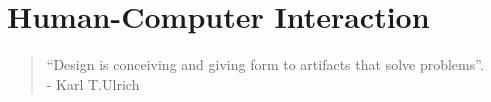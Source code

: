 \section{Human-Computer Interaction}
\label{sec:hcitheory}
\begin{quotation}
 ``Design is conceiving and giving form to artifacts that solve problems''. \\
 - Karl T.Ulrich
\end{quotation}
 


